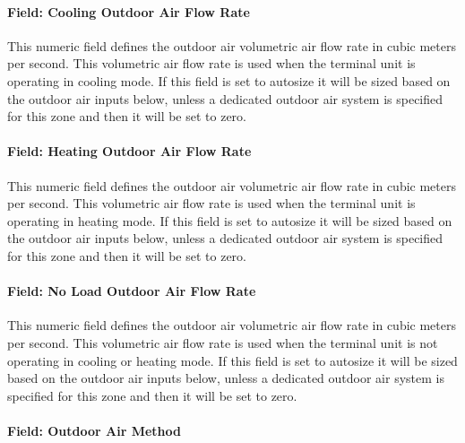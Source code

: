 \paragraph{Field: Cooling Outdoor Air Flow Rate}\label{field-cooling-outdoor-air-flow-rate}

This numeric field defines the outdoor air volumetric air flow rate in cubic meters per second. This volumetric air flow rate is used when the terminal unit is operating in cooling mode. If this field is set to autosize it will be sized based on the outdoor air inputs below, unless a dedicated outdoor air system is specified for this zone and then it will be set to zero.

\paragraph{Field: Heating Outdoor Air Flow Rate}\label{field-heating-outdoor-air-flow-rate}

This numeric field defines the outdoor air volumetric air flow rate in cubic meters per second. This volumetric air flow rate is used when the terminal unit is operating in heating mode. If this field is set to autosize it will be sized based on the outdoor air inputs below, unless a dedicated outdoor air system is specified for this zone and then it will be set to zero.

\paragraph{Field: No Load Outdoor Air Flow Rate}\label{field-no-load-outdoor-air-flow-rate}

This numeric field defines the outdoor air volumetric air flow rate in cubic meters per second. This volumetric air flow rate is used when the terminal unit is not operating in cooling or heating mode. If this field is set to autosize it will be sized based on the outdoor air inputs below, unless a dedicated outdoor air system is specified for this zone and then it will be set to zero.

\paragraph{Field: Outdoor Air Method}\label{field-outdoor-air-method-6}

